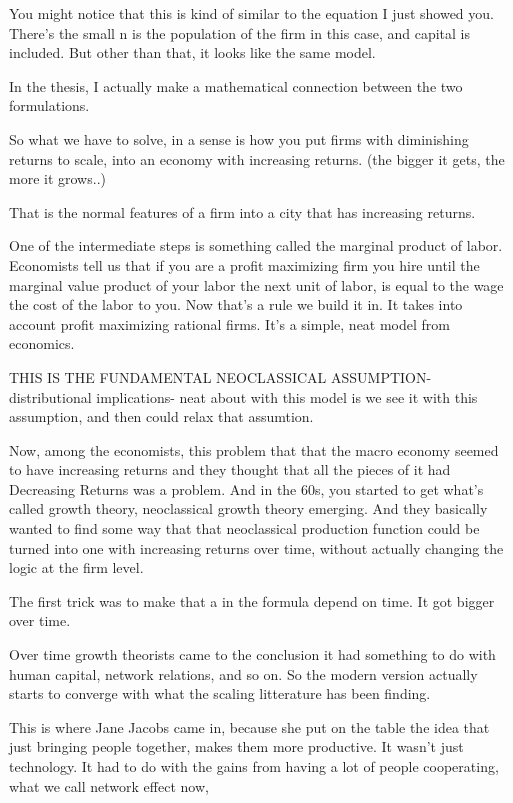 You might notice that this is kind of similar to the equation I just showed you. There's the small n is the population of the firm in this case, and capital is included. But other than that, it looks like the same model. 

In the thesis, I actually make a mathematical connection between the two formulations.

So what we have to solve, in a sense is how you put firms with diminishing returns to scale, into an economy with increasing returns. (the bigger it gets, the more it grows..)

That is the normal features of a firm into a city that has increasing returns.

One of the intermediate steps is something called the marginal product of labor. Economists tell us that if you are a profit maximizing firm you hire until the marginal value product of your labor the next unit of labor, is equal to the wage the cost of the labor to you. Now that's a rule we build it in. It takes into account profit maximizing rational firms. It's a simple, neat model from economics.

THIS IS THE FUNDAMENTAL NEOCLASSICAL ASSUMPTION- distributional implications- neat about with this model is we see it with this assumption, and then could relax that assumtion. 

Now, among the economists, this problem that that the macro economy seemed to have increasing returns and they thought that all the pieces of it had Decreasing Returns was a problem. And in the 60s, you started to get what's called growth theory, neoclassical growth theory emerging. And they basically wanted to find some way that that neoclassical production function could be turned into one with increasing returns over time, without actually changing the logic at the firm level.


The first trick was to make that a in the formula depend on time. It got bigger over time.

Over time  growth theorists came to the conclusion it had something to do with human capital, network relations, and so on. So the modern version actually starts to converge with what the scaling litterature has been finding. 

This is where Jane Jacobs came in, because she put on the table the idea that just bringing people together, makes them more productive. It wasn't just technology. It had to do with the gains from having a lot of people cooperating,  what we call  network effect now, 

